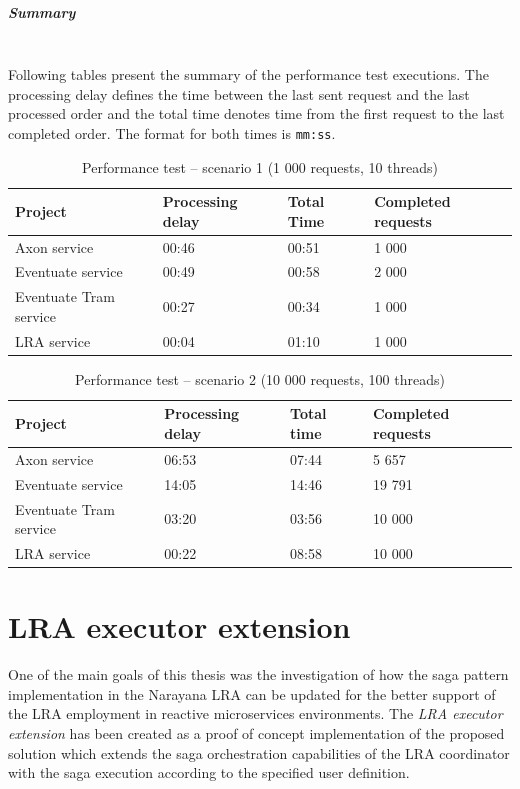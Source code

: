 \documentclass[oneside,
  digital, %
  table,   %
  lof,     %
  lot,     %
]{fithesis3}
\newcommand{\newlinepar}[1]{\paragraph{#1}\needspace{4\baselineskip}\mbox{}\\}
\begin{document}
\newlinepar{Summary}

Following tables present the summary of the performance test executions. The processing delay defines the time between the last sent request and the last processed order and the total time denotes time from the first request to the last completed order. The format for both times is \texttt{mm:ss}.

\begin{table}[h]
    \begin{tabularx}{\textwidth}{lXXX}
        \toprule
        Project & Processing delay & Total Time & Completed requests \\
        \midrule
        Axon service & 00:46 & 00:51 & 1 000 \\
        Eventuate service & 00:49 & 00:58 & 2 000 \\
        Eventuate Tram service & 00:27 & 00:34 & 1 000 \\
        LRA service & 00:04 & 01:10 & 1 000 \\
        \bottomrule
    \end{tabularx}
    \caption{Performance test -- scenario 1 (1 000 requests, 10 threads)}
    \label{tab:performance-scenario-1}
\end{table}

\begin{table}[h]
    \begin{tabularx}{\textwidth}{lXXX}
        \toprule
        Project & Processing delay & Total time & Completed requests \\
        \midrule
        Axon service & 06:53 & 07:44 & 5 657 \\
        Eventuate service & 14:05 & 14:46 & 19 791 \\
        Eventuate Tram service & 03:20 & 03:56 & 10 000 \\
        LRA service & 00:22 & 08:58 & 10 000 \\
        \bottomrule
    \end{tabularx}
    \caption{Performance test -- scenario 2 (10 000 requests, 100 threads)}
    \label{tab:performance-scenario-2}
\end{table}

\clearpage
\chapter{LRA executor extension}

One of the main goals of this thesis was the investigation of how the saga pattern implementation in the Narayana LRA can be updated for the better support of the LRA employment in reactive microservices environments. The \textit{LRA executor extension} has been created as a proof of concept implementation of the proposed solution which extends the saga orchestration capabilities of the LRA coordinator with the saga execution according to the specified user definition.
\end{document}
